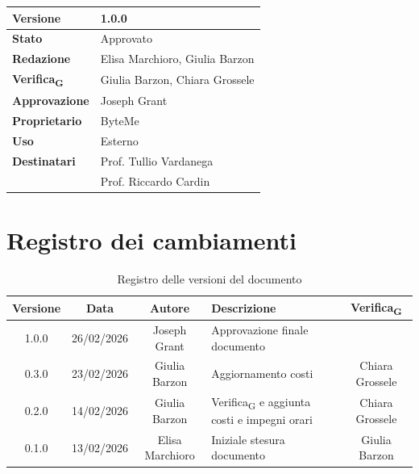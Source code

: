 \documentclass[11pt,a4paper]{article}
\newcommand{\gls}[1]{#1\textsubscript{G}}
\begin{document}
\begin{titlepage}
    \begin{table}[H]
        \centering
        \begin{tabular}{|l|p{5cm}|}
            \hline
            \textbf{Versione} & 1.0.0 \\
            \hline
            \textbf{Stato} & Approvato \\
            \hline
            \textbf{Redazione} & Elisa Marchioro, Giulia Barzon \\
            \hline
            \textbf{\gls{Verifica}} & Giulia Barzon, Chiara Grossele\\
            \hline
            \textbf{Approvazione} & Joseph Grant \\
            \hline
            \textbf{Proprietario} & ByteMe \\
            \hline
            \textbf{Uso} & Esterno \\
            \hline
            \textbf{Destinatari} & Prof. Tullio Vardanega \\ & Prof. Riccardo Cardin \\
            \hline
        \end{tabular}
    \end{table}
    
    \vfill
\end{titlepage}

\section*{Registro dei cambiamenti}

\begin{table}[H]
    \centering
    \begin{tabularx}{\textwidth}{|c|c|c|>{\raggedright\arraybackslash}X|c|}
        \hline
        \textbf{Versione} & \textbf{Data} & \textbf{Autore} & \textbf{Descrizione} & \textbf{\gls{Verifica}} \\
        \hline
        1.0.0 & 26/02/2026 & Joseph Grant & Approvazione finale documento &  \\
        \hline
        0.3.0 & 23/02/2026 & Giulia Barzon & Aggiornamento costi & Chiara Grossele\\
        \hline
        0.2.0 & 14/02/2026 & Giulia Barzon & \gls{Verifica} e aggiunta costi e impegni orari & Chiara Grossele\\
        \hline
        0.1.0 & 13/02/2026 & Elisa Marchioro & Iniziale stesura documento & Giulia Barzon\\
        \hline
    \end{tabularx}
    \caption{Registro delle versioni del documento}
    \label{tab:versionamento}
\end{table}
\end{document}
